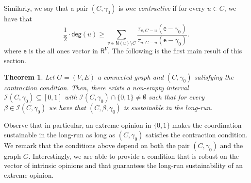 \documentclass[letterpaper,11pt]{article}
\newcommand{\RR}{\mathsf{R}}
\newcommand{\EE}{\mathsf{E}}
\newcommand{\nsf}{\mathsf{N}}
\newcommand{\degsf}{\mathsf{deg}}
\newtheorem{theorem}{Theorem}
\newcommand{\vvcom}[1]{\todo[color=red!25!white]{Victor: #1}}
\begin{document}
Similarly, we say that a pair $(C,\gamma_0)$ is {\it one contractive} if for every $u\in C$, we have that 
\begin{equation*}
\frac{1}{2}\cdot \degsf(u) \ge \sum_{v\in \nsf(u)\setminus C}\frac{\tau_{v,C-u}(\mathsf{e}-\gamma_0)}{\tau_{u,C-u}(\mathsf{e}-\gamma_0)}.
\end{equation*}
where $\mathsf{e}$ is the all ones vector in $\RR^V$.
The following is the first main result of this section.
\begin{theorem}
\label{thm:longrun}
Let $G=(V,E)$ a connected graph and $(C,\gamma_0)$ satisfying the contraction condition.
Then, there exists a non-empty interval $\mathcal{I}(C,\gamma_0)\subseteq [0,1]$ with $\mathcal{I}(C,\gamma_0)\cap \{0,1\}\ne \emptyset$ such that for every $\beta\in \mathcal{I}(C,\gamma_0)$ we have that $(C,\beta,\gamma_0)$ is sustainable in the long-run.  
\end{theorem}
Observe that in particular, an extreme opinion in $\{0,1\}$ makes the coordination sustainable in the long-run as long as $(C,\gamma_0)$ satisfies the contraction condition. 
We remark that the conditions above depend on both the pair $(C,\gamma_0)$ and the graph $G$.
Interestingly, we are able to provide a condition that is robust on the vector of intrinsic opinions and that guarantees the long-run sustainability of an extreme opinion.
\end{document}
